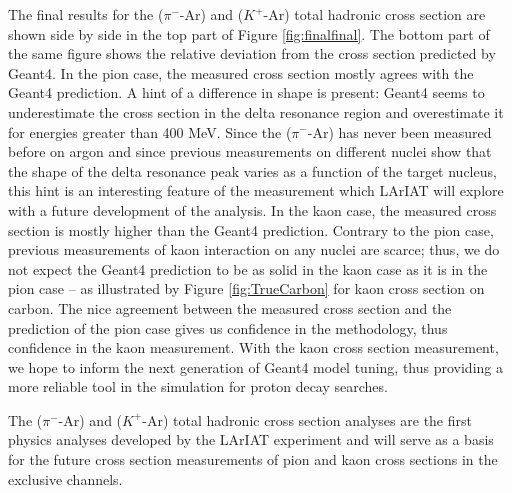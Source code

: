 The final results for the ($\pi^-$-Ar) and ($K^+$-Ar) total hadronic cross section are shown side by side in the top part of Figure \ref{fig:finalfinal}. The bottom part of the same figure shows the relative deviation from the cross section predicted by Geant4. In the pion case, the measured cross section mostly agrees with the Geant4 prediction. A hint of a difference in shape is present: Geant4 seems to underestimate the cross section in the delta resonance region and overestimate it for energies greater than 400 MeV. Since the   ($\pi^-$-Ar) has never been measured before on argon and since previous measurements on different nuclei show that the shape of the delta resonance peak varies as a function of the target nucleus, this hint is an interesting feature of the measurement which LArIAT will explore with a future development of the analysis.
In the kaon case, the measured cross section is mostly higher than the Geant4 prediction. Contrary to the pion case, previous measurements of kaon interaction on any nuclei are scarce; thus, we do not expect the Geant4 prediction to be as solid in the kaon case as it is in the pion case -- as illustrated  by Figure \ref{fig:TrueCarbon} for kaon cross section on carbon. The nice agreement between the measured cross section and the prediction of the pion case gives us confidence in the methodology, thus confidence in the kaon measurement. With the kaon cross section measurement, we hope to inform the next generation of Geant4 model tuning, thus providing a more reliable tool in the simulation for proton decay searches.

The ($\pi^-$-Ar) and ($K^+$-Ar) total hadronic cross section analyses are the first physics analyses developed by the LArIAT experiment and  will serve as a basis for the future cross section measurements of pion and kaon cross sections in the exclusive channels.

